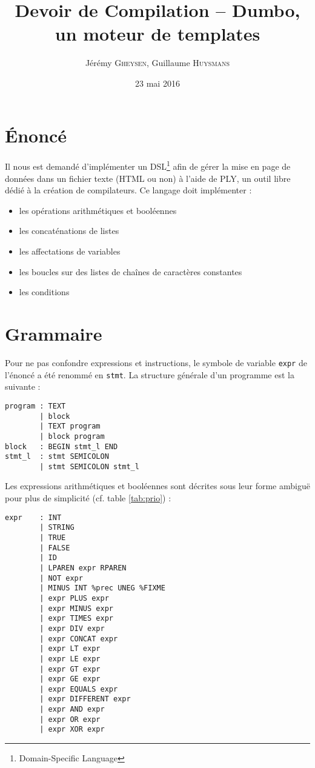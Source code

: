 \documentclass[12pt,twocolumn]{article}
\title{Devoir de Compilation -- Dumbo, un moteur de templates}
\author{Jérémy \textsc{Gheysen}, Guillaume \textsc{Huysmans}}
\date{23 mai 2016}
\begin{document}
\maketitle


\section{Énoncé}
Il nous est demandé d'implémenter un DSL\footnote{Domain-Specific Language}
afin de gérer la mise en page de données dans un fichier texte (HTML ou non)
à l'aide de PLY, un outil libre dédié à la création de compilateurs.
Ce langage doit implémenter :
\begin{itemize}
\item les opérations arithmétiques et booléennes
\item les concaténations de listes
\item les affectations de variables
\item les boucles sur des listes de chaînes de caractères constantes
\item les conditions
\end{itemize}


\section{Grammaire}
Pour ne pas confondre expressions et instructions, le symbole de variable
\texttt{expr} de l'énoncé a été renommé en \texttt{stmt}.
La structure générale d'un programme est la suivante :
\begin{verbatim}
program : TEXT
        | block
        | TEXT program
        | block program
block   : BEGIN stmt_l END
stmt_l  : stmt SEMICOLON
        | stmt SEMICOLON stmt_l
\end{verbatim}

Les expressions arithmétiques et booléennes sont décrites
sous leur forme ambiguë pour plus de simplicité
(cf. table \ref{tab:prio}) :
\begin{verbatim}
expr    : INT
        | STRING
        | TRUE
        | FALSE
        | ID
        | LPAREN expr RPAREN
        | NOT expr
        | MINUS INT %prec UNEG %FIXME
        | expr PLUS expr
        | expr MINUS expr
        | expr TIMES expr
        | expr DIV expr
        | expr CONCAT expr
        | expr LT expr
        | expr LE expr
        | expr GT expr
        | expr GE expr
        | expr EQUALS expr
        | expr DIFFERENT expr
        | expr AND expr
        | expr OR expr
        | expr XOR expr
\end{verbatim}
\end{document}
